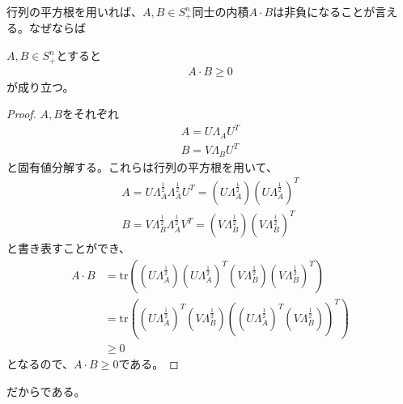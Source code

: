 行列の平方根を用いれば、$A, B \in S_+^n$同士の内積$A \cdot B$は非負になることが言える。なぜならば
\begin{theorem} \label{SemidefiniteInnerProduct}
  $A, B \in S_+^n$とすると
  \begin{align*}
    A \cdot B \geq 0
  \end{align*}
  が成り立つ。
\end{theorem}
\begin{proof}
  $A, B$をそれぞれ
  \begin{align*}
    A = U \Lambda_A U^T \\
    B = V \Lambda_B U^T
  \end{align*}
  と固有値分解する。これらは行列の平方根を用いて、
  \begin{align*}
    A = U \Lambda_A^\frac{1}{2} \Lambda_A^\frac{1}{2} U^T = \left(U \Lambda_A^\frac{1}{2}\right) \left(U \Lambda_A^\frac{1}{2}\right)^T\\
    B = V \Lambda_B^\frac{1}{2} \Lambda_A^\frac{1}{2} V^T = \left(V \Lambda_B^\frac{1}{2}\right) \left(V \Lambda_B^\frac{1}{2}\right)^T
  \end{align*}
  と書き表すことができ、
  \begin{align*}
    A \cdot B & = \mathrm{tr}\left(\left(U \Lambda_A^\frac{1}{2}\right) \left(U \Lambda_A^\frac{1}{2}\right)^T \left(V \Lambda_B^\frac{1}{2}\right) \left(V \Lambda_B^\frac{1}{2}\right)^T\right) \\
              & = \mathrm{tr}\left(\left(U \Lambda_A^\frac{1}{2}\right)^T \left(V \Lambda_B^\frac{1}{2}\right) \left(\left(U \Lambda_A^\frac{1}{2}\right)^T \left(V \Lambda_B^\frac{1}{2}\right)\right)^T\right) \\
              & \geq 0
  \end{align*}
  となるので、$A \cdot B \geq 0$である。
\end{proof}
だからである。

